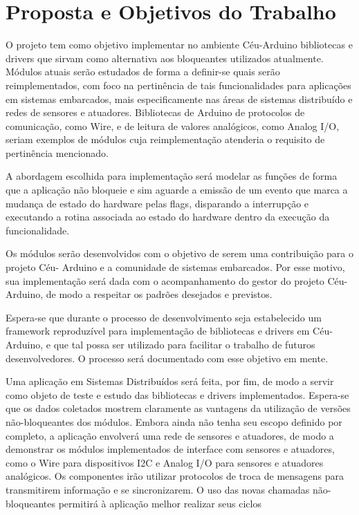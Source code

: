\documentclass{article}
\begin{document}
\section{Proposta e Objetivos do Trabalho}
\tab O projeto tem como objetivo implementar no ambiente Céu-Arduino bibliotecas e drivers que
sirvam como alternativa aos bloqueantes utilizados atualmente. Módulos atuais serão estudados de
forma a definir-se quais serão reimplementados, com foco na pertinência de tais funcionalidades para
aplicações em sistemas embarcados, mais especificamente nas áreas de sistemas distribuído e redes
de sensores e atuadores. Bibliotecas de Arduino de protocolos de comunicação, como Wire, e de
leitura de valores analógicos, como Analog I/O, seriam exemplos de módulos cuja reimplementação
atenderia o requisito de pertinência mencionado.
\par A abordagem escolhida para implementação será modelar as funções de forma que a aplicação não
bloqueie e sim aguarde a emissão de um evento que marca a mudança de estado do hardware pelas
flags, disparando a interrupção e executando a rotina associada ao estado do hardware dentro da
execução da funcionalidade.
\par Os módulos serão desenvolvidos com o objetivo de serem uma contribuição para o projeto Céu-
Arduino e a comunidade de sistemas embarcados. Por esse motivo, sua implementação será dada
com o acompanhamento do gestor do projeto Céu-Arduino, de modo a respeitar os padrões
desejados e previstos.
\par Espera-se que durante o processo de desenvolvimento seja estabelecido um framework reproduzível
para implementação de bibliotecas e drivers em Céu-Arduino, e que tal possa ser utilizado para
facilitar o trabalho de futuros desenvolvedores. O processo será documentado com esse objetivo em
mente.
\par Uma aplicação em Sistemas Distribuídos será feita, por fim, de modo a servir como objeto de teste e
estudo das bibliotecas e drivers implementados. Espera-se que os dados coletados mostrem
claramente as vantagens da utilização de versões não-bloqueantes dos módulos. Embora ainda não
tenha seu escopo definido por completo, a aplicação envolverá uma rede de sensores e atuadores, de
modo a demonstrar os módulos implementados de interface com sensores e atuadores, como o Wire
para dispositivos I2C e Analog I/O para sensores e atuadores analógicos. Os componentes irão
utilizar protocolos de troca de mensagens para transmitirem informação e se sincronizarem. O uso
das novas chamadas não-bloqueantes permitirá à aplicação melhor realizar seus ciclos
\end{document}
